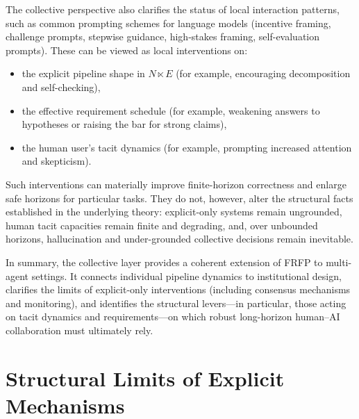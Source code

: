 \documentclass[11pt]{article}
\theoremstyle{definition}
\begin{document}
The collective perspective also clarifies the status of local interaction
patterns, such as common prompting schemes for language models (incentive
framing, challenge prompts, stepwise guidance, high-stakes framing,
self-evaluation prompts). These can be viewed as local interventions on:
\begin{itemize}
  \item the explicit pipeline shape in $N \ltimes E$ (for example,
        encouraging decomposition and self-checking),
  \item the effective requirement schedule (for example, weakening answers
        to hypotheses or raising the bar for strong claims),
  \item the human user's tacit dynamics (for example, prompting increased
        attention and skepticism).
\end{itemize}
Such interventions can materially improve finite-horizon correctness and
enlarge safe horizons for particular tasks. They do not, however, alter the
structural facts established in the underlying theory: explicit-only
systems remain ungrounded, human tacit capacities remain finite and
degrading, and, over unbounded horizons, hallucination and under-grounded
collective decisions remain inevitable.

In summary, the collective layer provides a coherent extension of FRFP to
multi-agent settings. It connects individual pipeline dynamics to
institutional design, clarifies the limits of explicit-only interventions
(including consensus mechanisms and monitoring), and identifies the
structural levers---in particular, those acting on tacit dynamics and
requirements---on which robust long-horizon human--AI collaboration must
ultimately rely.
\section{Structural Limits of Explicit Mechanisms}
\label{sec:structural-limits-explicit}
\end{document}
